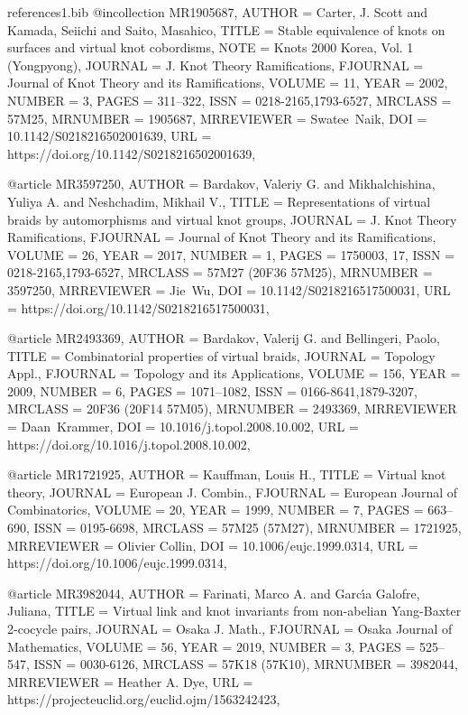 \documentclass[11pt, reqno]{amsart}
\theoremstyle{definition}
\begin{document}
\begin{filecontents*}[overwrite]{references1.bib}
@incollection {MR1905687,
    AUTHOR = {Carter, J. Scott and Kamada, Seiichi and Saito, Masahico},
     TITLE = {Stable equivalence of knots on surfaces and virtual knot
              cobordisms},
      NOTE = {Knots 2000 Korea, Vol. 1 (Yongpyong)},
   JOURNAL = {J. Knot Theory Ramifications},
  FJOURNAL = {Journal of Knot Theory and its Ramifications},
    VOLUME = {11},
      YEAR = {2002},
    NUMBER = {3},
     PAGES = {311--322},
      ISSN = {0218-2165,1793-6527},
   MRCLASS = {57M25},
  MRNUMBER = {1905687},
MRREVIEWER = {Swatee\ Naik},
       DOI = {10.1142/S0218216502001639},
       URL = {https://doi.org/10.1142/S0218216502001639},
}



@article {MR3597250,
    AUTHOR = {Bardakov, Valeriy G. and Mikhalchishina, Yuliya A. and
              Neshchadim, Mikhail V.},
     TITLE = {Representations of virtual braids by automorphisms and virtual
              knot groups},
   JOURNAL = {J. Knot Theory Ramifications},
  FJOURNAL = {Journal of Knot Theory and its Ramifications},
    VOLUME = {26},
      YEAR = {2017},
    NUMBER = {1},
     PAGES = {1750003, 17},
      ISSN = {0218-2165,1793-6527},
   MRCLASS = {57M27 (20F36 57M25)},
  MRNUMBER = {3597250},
MRREVIEWER = {Jie\ Wu},
       DOI = {10.1142/S0218216517500031},
       URL = {https://doi.org/10.1142/S0218216517500031},
}

@article {MR2493369,
    AUTHOR = {Bardakov, Valerij G. and Bellingeri, Paolo},
     TITLE = {Combinatorial properties of virtual braids},
   JOURNAL = {Topology Appl.},
  FJOURNAL = {Topology and its Applications},
    VOLUME = {156},
      YEAR = {2009},
    NUMBER = {6},
     PAGES = {1071--1082},
      ISSN = {0166-8641,1879-3207},
   MRCLASS = {20F36 (20F14 57M05)},
  MRNUMBER = {2493369},
MRREVIEWER = {Daan\ Krammer},
       DOI = {10.1016/j.topol.2008.10.002},
       URL = {https://doi.org/10.1016/j.topol.2008.10.002},
}

@article {MR1721925,
 AUTHOR = {Kauffman, Louis H.},
 TITLE = {Virtual knot theory},
 JOURNAL = {European J. Combin.},
 FJOURNAL = {European Journal of Combinatorics},
 VOLUME = {20},
 YEAR = {1999},
 NUMBER = {7},
 PAGES = {663--690},
 ISSN = {0195-6698},
 MRCLASS = {57M25 (57M27)},
 MRNUMBER = {1721925},
 MRREVIEWER = {Olivier Collin},
 DOI = {10.1006/eujc.1999.0314},
 URL = {https://doi.org/10.1006/eujc.1999.0314},
}

@article {MR3982044,
    AUTHOR = {Farinati, Marco A. and Garc\'{\i}a Galofre, Juliana},
     TITLE = {Virtual link and knot invariants from non-abelian
              {Y}ang-{B}axter 2-cocycle pairs},
   JOURNAL = {Osaka J. Math.},
  FJOURNAL = {Osaka Journal of Mathematics},
    VOLUME = {56},
      YEAR = {2019},
    NUMBER = {3},
     PAGES = {525--547},
      ISSN = {0030-6126},
   MRCLASS = {57K18 (57K10)},
  MRNUMBER = {3982044},
MRREVIEWER = {Heather A. Dye},
       URL = {https://projecteuclid.org/euclid.ojm/1563242423},
}


\end{filecontents*}
\end{document}
